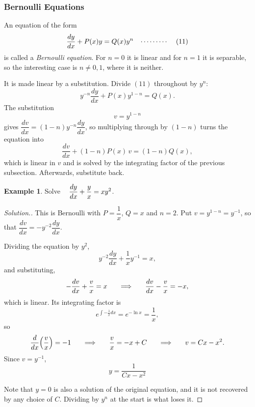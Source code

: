 \documentclass[11pt,a4paper]{article}
\theoremstyle{definition}
\newtheorem{exa}[thm]{Example}
\newenvironment{solution}
  {\renewcommand{\qedsymbol}{}\begin{proof}[\textit{Solution}.]}
  {\end{proof}}
\begin{document}
\subsubsection{Bernoulli Equations}

An equation of the form
$$\frac{dy}{dx} + P(x)y = Q(x)y^n \hspace{0.3cm}\cdots\cdots\cdots\hspace{0.4cm} (11)$$
is called a \emph{Bernoulli equation}. For $n = 0$ it is linear and for $n = 1$
it is separable, so the interesting case is $n \neq 0, 1$, where it is neither.

It is made linear by a substitution. Divide $(11)$ throughout by $y^n$:
$$y^{-n}\frac{dy}{dx} + P(x)y^{1-n} = Q(x).$$
The substitution
$$\boxed{v = y^{1-n}}$$
gives $\dfrac{dv}{dx} = (1-n)y^{-n}\dfrac{dy}{dx}$, so multiplying through by
$(1-n)$ turns the equation into
$$\frac{dv}{dx} + (1-n)P(x)\,v = (1-n)Q(x),$$
which is linear in $v$ and is solved by the integrating factor of the previous
subsection. Afterwards, substitute back.

\begin{exa}
Solve $\hspace{0.3cm}\dfrac{dy}{dx} + \dfrac{y}{x} = xy^2$.
\end{exa}

\begin{solution}
This is Bernoulli with $P = \dfrac{1}{x}$, $Q = x$ and $n = 2$. Put
$v = y^{1-n} = y^{-1}$, so that
$\dfrac{dv}{dx} = -y^{-2}\dfrac{dy}{dx}$.

Dividing the equation by $y^2$,
$$y^{-2}\frac{dy}{dx} + \frac{1}{x}y^{-1} = x ,$$
and substituting,
$$-\frac{dv}{dx} + \frac{v}{x} = x
\hspace{0.5cm}\implies\hspace{0.5cm}
\frac{dv}{dx} - \frac{v}{x} = -x ,$$
which is linear. Its integrating factor is
$$e^{\int -\frac{1}{x}dx} = e^{-\ln x} = \frac{1}{x},$$
so
$$\frac{d}{dx}\Big(\frac{v}{x}\Big) = -1
\hspace{0.5cm}\implies\hspace{0.5cm} \frac{v}{x} = -x + C
\hspace{0.5cm}\implies\hspace{0.5cm} v = Cx - x^2 .$$
Since $v = y^{-1}$,
$$\boxed{y = \frac{1}{Cx - x^2}}$$

Note that $y = 0$ is also a solution of the original equation, and it is not
recovered by any choice of $C$. Dividing by $y^n$ at the start is what loses it.
\end{solution}
\end{document}
